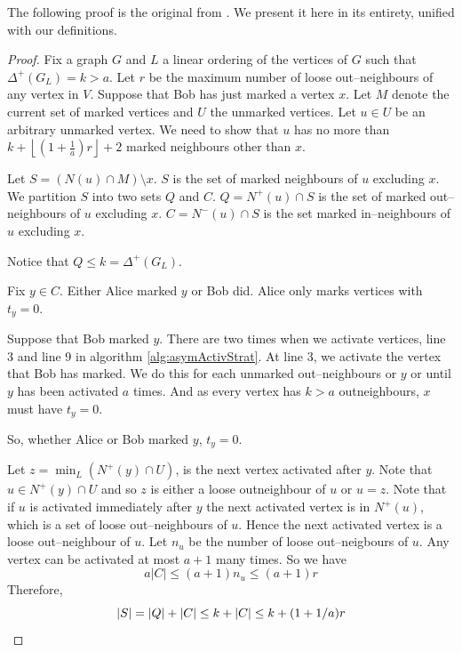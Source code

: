The following proof is the original from \cite{yangZhu2008}. We present it here in its entirety, unified with our definitions.

\begin{proof}
%
Fix a graph $G$ and $L$ a linear ordering of the vertices of $G$ such that $\Delta^+(G_L)=k>a$. Let $r$ be the maximum number of loose out--neighbours of any vertex in $V$. Suppose that Bob has just marked a vertex $x$. Let $M$ denote the current set of marked vertices and $U$ the unmarked vertices. Let $u\in U$ be an arbitrary unmarked vertex. We need to show that $u$ has no more than  $k+\left\lfloor \left(1+\frac{1}{a}\right)r \right\rfloor +2$ marked neighbours other than $x$. 

Let $S=(N(u)\cap M) \setminus {x}$. $S$ is the set of marked neighbours of $u$ excluding $x$. We partition $S$ into two sets $Q$ and $C$. $Q=N^+(u)\cap S$ is the set of marked out--neighbours of $u$ excluding $x$. $C=N^-(u)\cap S$ is  the set marked in--neighbours of $u$ excluding $x$.

Notice that $Q\leq k = \Delta^+(G_L)$. 

Fix $y\in C$. Either Alice marked $y$ or Bob did. Alice only marks vertices with $t_y=0$. 

Suppose that Bob marked $y$.
There are two times when we activate vertices, line 3 and line 9 in algorithm \ref{alg:asymActivStrat}. At line 3, we activate the vertex that Bob has marked. We do this for each unmarked out--neighbours or $y$ or until $y$ has been activated $a$ times. And as every vertex has $k>a$ outneighbours, $x$ must have $t_y=0$.

So, whether Alice or Bob marked $y$, $t_y=0$.

Let $z = \min_{L}(N^+(y)\cap U)$, is the next vertex activated after $y$. Note that $u\in N^+(y)\cap U$ and so $z$ is either a loose outneighbour of $u$ or $u=z$. Note that if $u$ is activated immediately after $y$ the next activated vertex is in $N^+(u)$, which is a set of loose out--neighbours of $u$. Hence the next activated vertex is a loose out--neighbour of $u$. Let $n_u$ be the number of loose out--neigbours of $u$. Any vertex can be activated at most $a+1$ many times. So we have 
\[a|C|\leq (a+1)n_u\leq (a+1)r\]
Therefore,
\[|S|=|Q|+|C|\leq k +|C| \leq k + (1+1/a)r \qedhere\] 
\end{proof}

    
